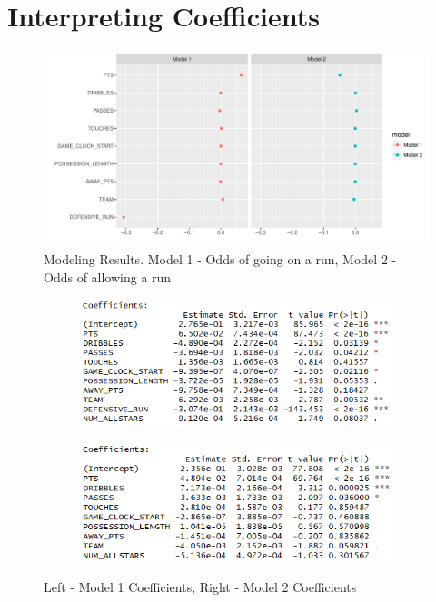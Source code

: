 \documentclass{article}
\begin{document}
\section{Interpreting Coefficients}

\begin{figure}[h]
\begin{center}
\includegraphics[width=175mm]{results.pdf}
\caption{Modeling Results. Model 1 - Odds of going on a run, Model 2 - Odds of allowing a run}
\end{center}
\end{figure}


\begin{figure}[h]
\centering
\begin{subfigure}{.5\textwidth}
  \centering
  \includegraphics[width=\linewidth]{odds_run_for.png}
  \label{fig:sub1}
\end{subfigure}%
\begin{subfigure}{.5\textwidth}
  \centering
  \includegraphics[width=\linewidth]{odds_run_against.png}
  \label{fig:sub2}
\end{subfigure}
\caption{Left - Model 1 Coefficients, Right - Model 2 Coefficients}
\label{fig:test}
\end{figure}
\end{document}
